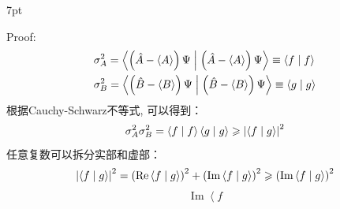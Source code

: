 \documentclass[a4paper,zihao=-4,linespread=1]{ctexrep}
\newenvironment{thinknote}{%
\def\FrameCommand{%
\hspace{1pt}%
{\color{BurlyWood}\vrule width 2pt}%
{\color{formalshade}\vrule width 4pt}%
\colorbox{formalshade}%
}%
\MakeFramed{\advance\hsize-\width\FrameRestore}%
\noindent\hspace{-4.55pt}%
\begin{adjustwidth}{}{7pt}%
\vspace{2pt}\vspace{2pt}%
}
{%
\vspace{2pt}\end{adjustwidth}\endMakeFramed%
}
\begin{document}
    \begin{thinknote}
        Proof:
        \begin{align}
            &\sigma _A^2 = \left\langle {{\left( {\hat A - \left\langle A \right\rangle } \right)\Psi }}
            \mathrel{\left | {\vphantom {{\left( {\hat A - \left\langle A \right\rangle } \right)\Psi } {\left( {\hat A - \left\langle A \right\rangle } \right)\Psi }}}
            \right. \kern-\nulldelimiterspace}
            {{\left( {\hat A - \left\langle A \right\rangle } \right)\Psi }} \right\rangle  \equiv \left\langle {f}
            \mathrel{\left | {\vphantom {f f}}
            \right. \kern-\nulldelimiterspace}
            {f} \right\rangle \\
            &\sigma _B^2 = \left\langle {{\left( {\hat B - \left\langle B \right\rangle } \right)\Psi }}
            \mathrel{\left | {\vphantom {{\left( {\hat B - \left\langle B \right\rangle } \right)\Psi } {\left( {\hat B - \left\langle B \right\rangle } \right)\Psi }}}
            \right. \kern-\nulldelimiterspace}
            {{\left( {\hat B - \left\langle B \right\rangle } \right)\Psi }} \right\rangle  \equiv \left\langle {g}
            \mathrel{\left | {\vphantom {g g}}
            \right. \kern-\nulldelimiterspace}
            {g} \right\rangle 
        \end{align}
        根据Cauchy-Schwarz不等式, 可以得到：
        \[\sigma _A^2\sigma _B^2 = \left\langle {f}
        \mathrel{\left | {\vphantom {f f}}
        \right. \kern-\nulldelimiterspace}
        {f} \right\rangle \left\langle {g}
        \mathrel{\left | {\vphantom {g g}}
        \right. \kern-\nulldelimiterspace}
        {g} \right\rangle  \geqslant {\left| {\left\langle {f}
        \mathrel{\left | {\vphantom {f g}}
        \right. \kern-\nulldelimiterspace}
        {g} \right\rangle } \right|^2}\]
        任意复数可以拆分实部和虚部：
        \[{\left| {\left\langle {f}
        \mathrel{\left | {\vphantom {f g}}
        \right. \kern-\nulldelimiterspace}
        {g} \right\rangle } \right|^2} = {\left( {\operatorname{Re} \left\langle {f}
        \mathrel{\left | {\vphantom {f g}}
        \right. \kern-\nulldelimiterspace}
        {g} \right\rangle } \right)^2} + {\left( {\operatorname{Im} \left\langle {f}
        \mathrel{\left | {\vphantom {f g}}
        \right. \kern-\nulldelimiterspace}
        {g} \right\rangle } \right)^2} \geqslant {\left( {\operatorname{Im} \left\langle {f}
        \mathrel{\left | {\vphantom {f g}}
        \right. \kern-\nulldelimiterspace}
        {g} \right\rangle } \right)^2}\]
        \[\operatorname{Im} \left\langle {f}
\]
\end{thinknote}
\end{document}
